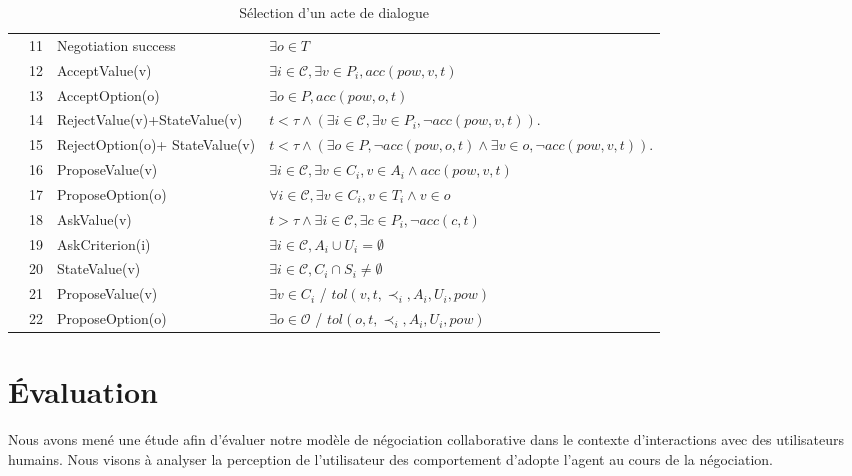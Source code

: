 \documentclass [french]{sig-alternate-05-2015}
\begin{document}
\begin{table}[!t]
{\begin{tabular}{|p{.3cm}|p{.6cm}|p{3cm}|p{7.5cm}|}
						\hline
						
						\parbox[t]{2mm}{
							} & 11& Negotiation success &  $\exists o \in T$ \\
						&12& AcceptValue(v) & $\exists i\in\mathcal{C}, \exists v \in P_i, acc(pow, v, t)$ \\
						&13&AcceptOption(o) & $\exists o \in P, acc(pow, o, t)$ \\
						&14&RejectValue(v)+\newline StateValue(v) & $ t<\tau \land (\exists i\in\mathcal{C}, \exists v \in P_i, \neg acc(pow,v, t))$.\\
						&15&RejectOption(o)+ \newline StateValue(v) & $ t<\tau \land (\exists o \in P,  \neg acc(pow,o, t) \land \exists v \in o, \neg acc(pow,v, t))$.\\
						&16&ProposeValue(v) &  $\exists i\in\mathcal{C}, \exists v \in C_i, v \in A_i  \land acc(pow, v, t) $\\
						&17&ProposeOption(o)  & $\forall i\in\mathcal{C},\exists v \in C_i, v \in T_i  \land v \in o$ \\
						&18&AskValue(v) & $t > \tau \land \exists i\in\mathcal{C}, \exists c \in P_i, \neg acc(c, t)$ \\
						&19&AskCriterion(i) & $\exists i\in\mathcal{C}, A_i \cup U_i= \emptyset $\\
						&20&StateValue(v) & $\exists i\in\mathcal{C}, C_i\cap S_i \neq \emptyset$	\\
						&21& ProposeValue(v) & $\exists v \in C_i$ / $tol(v, t, \prec_i, A_i, U_i, pow)$\\
						&22& ProposeOption(o) & $\exists o \in \mathcal{O}$ / $tol(o, t, \prec_i, A_i, U_i, pow)$\\
						
						\hline
					\end{tabular}
				}
				\caption{Sélection d'un acte de dialogue}
				\label{table:uttChoice}
			\end{table}
	
		
			\section{Évaluation}
			\label{sec:eval}
			Nous avons mené une étude afin d'évaluer notre modèle de négociation collaborative dans le contexte d'interactions avec des utilisateurs humains. Nous visons à analyser la perception de l'utilisateur des comportement d'adopte l'agent au cours de la négociation.
			
\end{document}
